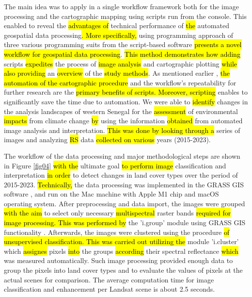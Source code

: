 \documentclass[earth,article,submit,pdftex,moreauthors]{Definitions/mdpi}
\begin{document}
The main idea was to apply in a single workflow framework both for the image processing and the cartographic mapping using scripts run from the console. This enabled to reveal the \hl{advantages of }technical performance of \hl{the }automated geospatial data processing\hl{. More specifically, }using programming approach of three various programming suits from the script-based software \hl{presents a novel workflow for geospatial data processing}. \hl{This method demonstrates how adding} scripts \hl{expedites} the process of \hl{image analysis} and cartographic plotting \hl{while also providing} an \hl{overview} of the \hl{study methods}. As mentioned earlier \cite{Lemenkova202215}, \hl{the automation of the cartographic procedure} and the workflow's repeatability for further research are the \hl{primary benefits of scripts. Moreover, scripting} enables to significantly save the time due to automation. We were able to \hl{identify} changes in the analysis landscapes of western Senegal for the \hl{assessment} of environmental \hl{impacts} from climate change \hl{by} using the information \hl{obtained} from automated image analysis and interpretation. \hl{This was done by looking through a} series of images and analyzing \hl{RS} data \hl{collected on various} years (2015-2023). 

The workflow of the data processing and major methodological steps are shown in Figure \ref{fig04} \hl{with the} ultimate goal \hl{to perform image} classification and interpretation \hl{in order} to detect changes in land cover types over the period of 2015-2023. \hl{Technically, }the\hl{ }data processing was implemented in the GRASS GIS software \cite{NETELER2012124}, and run on the Mac machine with Apple M1 chip and macOS operating system. After preprocessing and data import, the images were grouped \hl{with the aim }to select only\hl{ }necessary \hl{multispectral }raster bands \hl{required for image processing. This was performed by} the 'i.group' module using GRASS GIS functionality \cite{NetelerMitasova2008}. Afterwards, the images were clustered using the\hl{ }procedure \hl{of unsupervised classification. This was carried out utilizing the} module 'i.cluster' which \hl{assignes} pixels \hl{into} the groups \hl{according} their spectral reflectance \hl{which} was measured automatically. Such image processing provided enough data to group the pixels into land cover types and to evaluate the values of pixels at the actual scenes for comparison. The average computation time for image classification and enhancement per Landsat scene is about 2.5 seconds.
\end{document}
